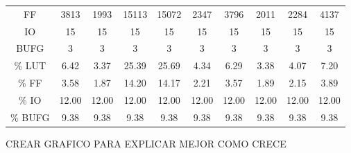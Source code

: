 \begin{table}[H]
{\begin{center}
{\begin{tabular}{ c c c c c c c c c c  }
						FF 				& 3813  & 1993  & 15113 & 15072 & 2347  & 3796  & 2011  & 2284  & 4137\\
						IO 				& 15    & 15    & 15    & 15    & 15    & 15    & 15    & 15    & 15\\
						BUFG 			& 3     & 3     & 3     & 3     & 3     & 3     & 3     & 3     & 3\\
						\hline
						\% LUT 			& 6.42  & 3.37  & 25.39 & 25.69 & 4.34  & 6.29  & 3.38  & 4.07  & 7.20\\
						\% FF 			& 3.58  & 1.87  & 14.20 & 14.17 & 2.21  & 3.57  & 1.89  & 2.15  & 3.89\\
						\% IO 			& 12.00 & 12.00 & 12.00 & 12.00 & 12.00 & 12.00 & 12.00 & 12.00 & 12.00\\
						\% BUFG 		& 9.38  & 9.38  & 9.38  & 9.38  & 9.38  & 9.38  & 9.38  & 9.38  & 9.38\\
					\end{tabular}
				}
			\end{center}
		}    
	\end{table}
	
	CREAR GRAFICO PARA EXPLICAR MEJOR COMO CRECE
	
	